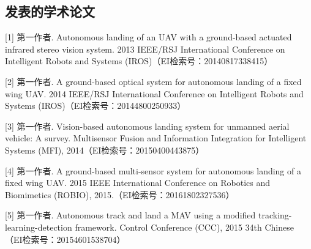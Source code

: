 \begin{resume}

\section*{发表的学术论文} %

[1] 第一作者. Autonomous landing of an UAV with a ground-based actuated infrared stereo vision system.	2013 IEEE/RSJ International Conference on Intelligent Robots and Systems (IROS)（EI检索号：20140817338415）

[2] 第一作者. A ground-based optical system for autonomous landing of a fixed wing UAV.	2014 IEEE/RSJ International Conference on Intelligent Robots and Systems	(IROS)（EI检索号：20144800250933）

[3] 第一作者. Vision-based autonomous landing system for unmanned aerial vehicle: A survey.	Multisensor Fusion and Information Integration for Intelligent Systems (MFI),  2014（EI检索号：20150400443875）

[4] 第一作者. A ground-based multi-sensor system for autonomous landing of a fixed wing UAV. 2015 IEEE International Conference on Robotics and Biomimetics (ROBIO), 2015.（EI检索号：20161802327536）

[5] 第一作者. Autonomous track and land a MAV using a modified tracking-learning-detection framework. Control Conference (CCC), 2015 34th Chinese （EI检索号：20154601538704）




\end{resume}
